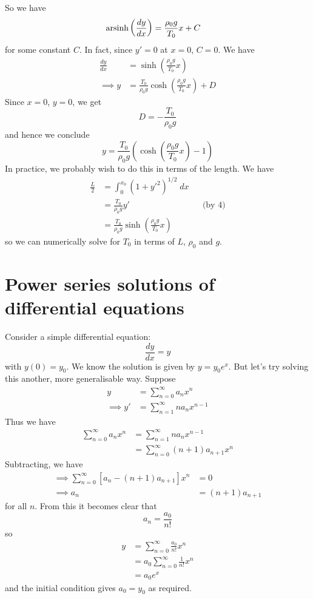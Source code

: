 \documentclass{../template/note}
\begin{document}
    So we have
    \begin{align*}
        \operatorname{arsinh}\left(\frac{dy}{dx}\right) &= \frac{\rho_0g}{T_0}x + C
    \end{align*}
    for some constant $C$. In fact, since $y' = 0$ at $x=0$, $C = 0$. We have
    \begin{align*}
        \frac{dy}{dx} &= \sinh\left(\frac{\rho_0g}{T_0}x\right) \\
        \implies y &= \frac{T_0}{\rho_0g}\cosh\left(\frac{\rho_0g}{T_0}x\right) + D
    \end{align*}
    Since $x=0$, $y=0$, we get
    \[ 
        D = -\frac{T_0}{\rho_0g}
    \]
    and hence we conclude
    \[
        \boxed{y = \frac{T_0}{\rho_0g}\left(\cosh\left(\frac{\rho_0g}{T_0}x\right)-1\right)}
    \]
    In practice, we probably wish to do this in terms of the length. We have
    \begin{align*}
        \frac{L}{2} &= \int_0^{x_0} \left(1+y'^2\right)^{1/2} \; dx \\
        &= \frac{T_0}{\rho_0g}y' && \text{(by 4)}\\
        &= \frac{T_0}{\rho_0g}\sinh\left(\frac{\rho_0g}{T_0}x\right)
    \end{align*}
    so we can numerically solve for $T_0$ in terms of $L$, $\rho_0$ and $g$. 
    
    \section{Power series solutions of differential equations}

    Consider a simple differential equation:
    \[
        \frac{dy}{dx} = y
    \]
    with $y(0) = y_0$. We know the solution is given by $y = y_0e^x$. But let's try solving this another, more generalisable way. Suppose
    \begin{align*}
        y &= \sum_{n=0}^\infty a_n x^n \\
        \implies y' &= \sum_{n=1}^\infty na_n x^{n-1}
    \end{align*}
    Thus we have
    \begin{align*}
        \sum_{n=0}^\infty a_n x^n &= \sum_{n=1}^\infty na_n x^{n-1} \\
        &= \sum_{n=0}^\infty (n+1)a_{n+1}x^n
    \end{align*}
    Subtracting, we have
    \begin{align*}
        \implies \sum_{n=0}^\infty [a_n - (n+1)a_{n+1}]x^n &= 0 \\
        \implies a_n &= (n+1)a_{n+1}
    \end{align*}
    for all $n$. From this it becomes clear that
    \[
        a_n = \frac{a_0}{n!}
    \]
    so
    \begin{align*}
        y &= \sum_{n=0}^\infty \frac{a_0}{n!} x^n \\
        &= a_0 \sum_{n=0}^\infty \frac{1}{n!} x^n \\
        &= a_0 e^x
    \end{align*}
    and the initial condition gives $a_0 = y_0$ as required.
    
    
    
    
\end{document}
